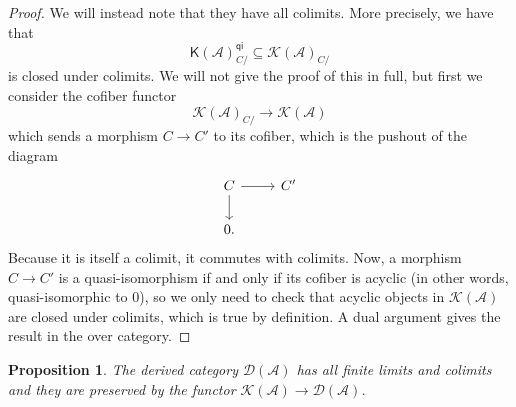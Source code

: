 \documentclass[10pt, oneside]{memoir}
\newtheorem{prop}[thm]{Proposition}
\theoremstyle{definition}
\theoremstyle{remark}
\theoremstyle{plain}
\theoremstyle{definition}
\theoremstyle{remark}
\newcommand{\mc}[1]{\mathcal{#1}}
\newcommand{\ms}[1]{\mathsf{#1}}
\newcommand{\1}{\mathbf{1}}
\newcommand{\2}{\mathbf{2}}
\newcommand{\3}{\mathbf{3}}
\begin{document}
\begin{proof}
    We will instead note that they have all colimits. More precisely, we have that
    \[ \ms{K}(\mc{A})_{C/}^{\ms{qi}} \subseteq \mc{K}(\mc{A})_{C/} \]
    is closed under colimits. We will not give the proof of this in full, but first we consider the cofiber functor
    \[ \mc{K}(\mc{A})_{C/} \to \mc{K}(\mc{A}) \]
    which sends a morphism \(C \to C' \) to its cofiber, which is the pushout of the diagram
    \begin{equation*}
    \begin{tikzcd}
        C \ar{r} \ar{d} & C' \\
        0.
    \end{tikzcd}
    \end{equation*}
    Because it is itself a colimit, it commutes with colimits. Now, a morphism \(C \to C' \) is a quasi-isomorphism if and only if its cofiber is acyclic (in other words, quasi-isomorphic to \(0 \)), so we only need to check that acyclic objects in \(\mc{K}(\mc{A}) \) are closed under colimits, which is true by definition. A dual argument gives the result in the over category.
\end{proof}

\begin{prop}
    The derived category \(\mc{D}(\mc{A}) \) has all finite limits and colimits and they are preserved by the functor \(\mc{K}(\mc{A}) \to \mc{D}(\mc{A}) \).
\end{prop}
\end{document}
